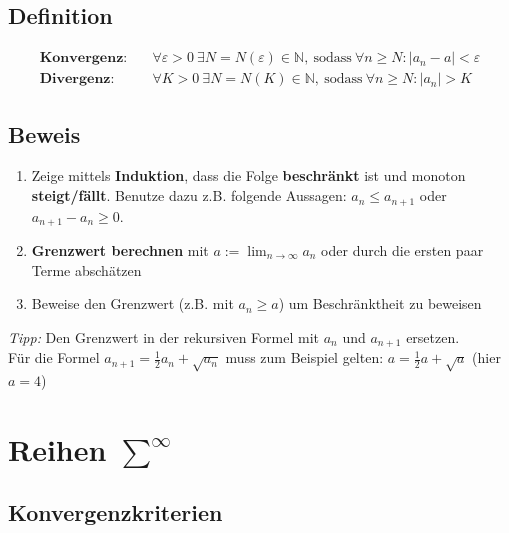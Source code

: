 \documentclass[11pt]{article}
\begin{document}
\subsection{Definition}

\begin{equation*}
\begin{split}
	\textbf{Konvergenz:} \quad & \forall \varepsilon > 0\ \exists N = N(\varepsilon) \in \mathbb{N},\ \text{sodass}\ \forall n \geq N: |a_n - a| < \varepsilon \\
	\textbf{Divergenz:} \quad & \forall K > 0\ \exists N = N(K) \in \mathbb{N},\ \text{sodass}\ \forall n \geq N: |a_n| > K
\end{split}
\end{equation*}

\subsection{Beweis}

\begin{enumerate}[noitemsep]
	\item Zeige mittels \textbf{Induktion}, dass die Folge \textbf{beschr{\"a}nkt} ist und monoton \textbf{steigt/f{\"a}llt}. Benutze dazu z.B. folgende Aussagen: $a_n \leq a_{n+1}$ oder $a_{n+1}-a_n \geq 0$.
	\item \textbf{Grenzwert berechnen} mit $a := \lim_{n \to \infty} a_n$ oder durch die ersten paar Terme absch{\"a}tzen
	\item Beweise den Grenzwert (z.B. mit $a_n \geq a$) um Beschr{\"a}nktheit zu beweisen
\end{enumerate}

\emph{Tipp:} Den Grenzwert in der rekursiven Formel mit $a_n$ und $a_{n+1}$ ersetzen. \\
F{\"u}r die Formel $a_{n+1} = \frac{1}{2}a_n + \sqrt{a_n}$ muss zum Beispiel gelten: $a = \frac{1}{2}a + \sqrt{a}$ (hier $a = 4$)

\section{Reihen $\sum^\infty$}

\subsection{Konvergenzkriterien}
\end{document}
